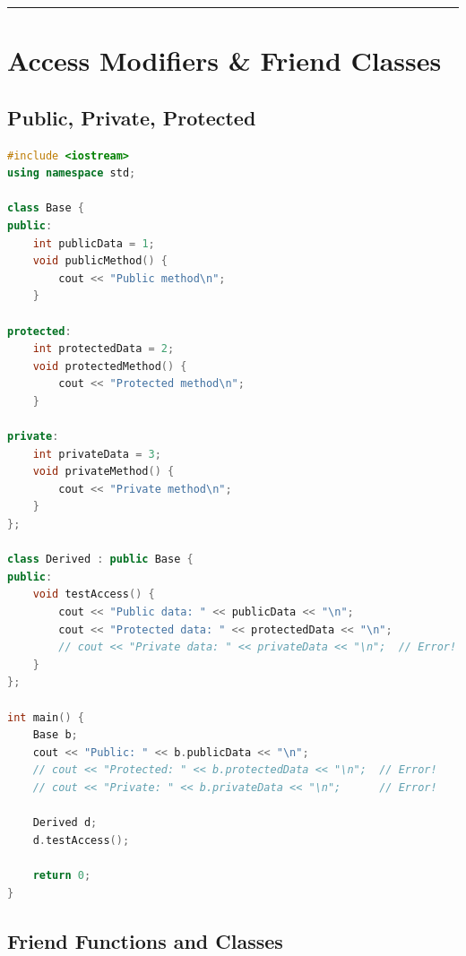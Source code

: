 \begin{center}\rule{0.5\linewidth}{0.5pt}\end{center}

\hypertarget{access-modifiers-friend-classes}{%
\section{Access Modifiers \& Friend
Classes}\label{access-modifiers-friend-classes}}

\hypertarget{public-private-protected}{%
\subsection{Public, Private, Protected}\label{public-private-protected}}

\begin{lstlisting}[language={C++}]
#include <iostream>
using namespace std;

class Base {
public:
    int publicData = 1;
    void publicMethod() {
        cout << "Public method\n";
    }
    
protected:
    int protectedData = 2;
    void protectedMethod() {
        cout << "Protected method\n";
    }
    
private:
    int privateData = 3;
    void privateMethod() {
        cout << "Private method\n";
    }
};

class Derived : public Base {
public:
    void testAccess() {
        cout << "Public data: " << publicData << "\n";
        cout << "Protected data: " << protectedData << "\n";
        // cout << "Private data: " << privateData << "\n";  // Error!
    }
};

int main() {
    Base b;
    cout << "Public: " << b.publicData << "\n";
    // cout << "Protected: " << b.protectedData << "\n";  // Error!
    // cout << "Private: " << b.privateData << "\n";      // Error!
    
    Derived d;
    d.testAccess();
    
    return 0;
}
\end{lstlisting}

\hypertarget{friend-functions-and-classes}{%
\subsection{Friend Functions and
Classes}\label{friend-functions-and-classes}}

